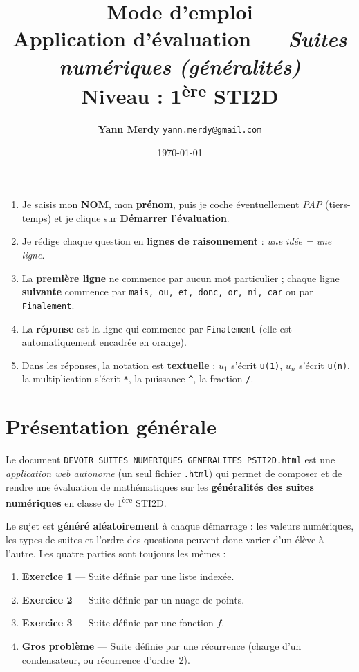 \documentclass[11pt,a4paper]{article}
\title{\vspace{-1.2cm}\textbf{\color{bleufonce}Mode d'emploi}\\[2pt]
       \large Application d'évaluation — \emph{Suites numériques (généralités)}\\
       \normalsize Niveau : 1\textsuperscript{ère} STI2D}
\author{\textbf{Yann Merdy} \quad\texttt{\small yann.merdy@gmail.com}}
\date{\today}
\begin{document}
\maketitle
\thispagestyle{fancy}

\begin{retenir}
\begin{enumerate}
  \item Je saisis mon \textbf{NOM}, mon \textbf{prénom}, puis je coche éventuellement
        \emph{PAP} (tiers-temps) et je clique sur \textbf{Démarrer l'évaluation}.
  \item Je rédige chaque question en \textbf{lignes de raisonnement} :
        \emph{une idée = une ligne}.
  \item La \textbf{première ligne} ne commence par aucun mot particulier ;
        chaque ligne \textbf{suivante} commence par \texttt{mais, ou, et, donc, or, ni, car}
        ou par \texttt{Finalement}.
  \item La \textbf{réponse} est la ligne qui commence par \texttt{Finalement}
        (elle est automatiquement encadrée en orange).
  \item Dans les réponses, la notation est \textbf{textuelle} :
        \(u_1\) s'écrit \verb|u(1)|, \(u_n\) s'écrit \verb|u(n)|,
        la multiplication s'écrit \verb|*|, la puissance \verb|^|,
        la fraction \verb|/|.
\end{enumerate}
\end{retenir}

\tableofcontents
\newpage

\section{Présentation générale}

Le document \texttt{DEVOIR\_SUITES\_NUMERIQUES\_GENERALITES\_PSTI2D.html} est une
\emph{application web autonome} (un seul fichier \texttt{.html}) qui permet de composer
et de rendre une évaluation de mathématiques sur les \textbf{généralités des suites
numériques} en classe de 1\textsuperscript{ère} STI2D.

Le sujet est \textbf{généré aléatoirement} à chaque démarrage : les valeurs numériques,
les types de suites et l'ordre des questions peuvent donc varier d'un élève à l'autre.
Les quatre parties sont toujours les mêmes :

\begin{enumerate}
  \item \textbf{Exercice 1} — Suite définie par une liste indexée.
  \item \textbf{Exercice 2} — Suite définie par un nuage de points.
  \item \textbf{Exercice 3} — Suite définie par une fonction \(f\).
  \item \textbf{Gros problème} — Suite définie par une récurrence (charge d'un
        condensateur, ou récurrence d'ordre~2).
\end{enumerate}
\end{document}

